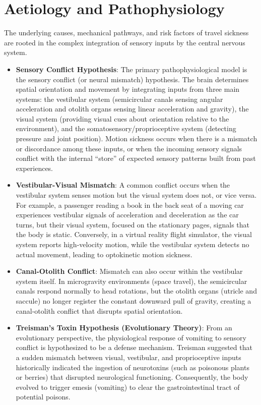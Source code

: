 \section*{Aetiology and Pathophysiology}
The underlying causes, mechanical pathways, and risk factors of travel sickness are rooted in the complex integration of sensory inputs by the central nervous system.
\begin{itemize}
    \item \textbf{Sensory Conflict Hypothesis}: The primary pathophysiological model is the sensory conflict (or neural mismatch) hypothesis. The brain determines spatial orientation and movement by integrating inputs from three main systems: the vestibular system (semicircular canals sensing angular acceleration and otolith organs sensing linear acceleration and gravity), the visual system (providing visual cues about orientation relative to the environment), and the somatosensory/proprioceptive system (detecting pressure and joint position). Motion sickness occurs when there is a mismatch or discordance among these inputs, or when the incoming sensory signals conflict with the internal ``store'' of expected sensory patterns built from past experiences.
    \item \textbf{Vestibular-Visual Mismatch}: A common conflict occurs when the vestibular system senses motion but the visual system does not, or vice versa. For example, a passenger reading a book in the back seat of a moving car experiences vestibular signals of acceleration and deceleration as the car turns, but their visual system, focused on the stationary pages, signals that the body is static. Conversely, in a virtual reality flight simulator, the visual system reports high-velocity motion, while the vestibular system detects no actual movement, leading to optokinetic motion sickness.
    \item \textbf{Canal-Otolith Conflict}: Mismatch can also occur within the vestibular system itself. In microgravity environments (space travel), the semicircular canals respond normally to head rotations, but the otolith organs (utricle and saccule) no longer register the constant downward pull of gravity, creating a canal-otolith conflict that disrupts spatial orientation.
    \item \textbf{Treisman's Toxin Hypothesis (Evolutionary Theory)}: From an evolutionary perspective, the physiological response of vomiting to sensory conflict is hypothesized to be a defense mechanism. Treisman suggested that a sudden mismatch between visual, vestibular, and proprioceptive inputs historically indicated the ingestion of neurotoxins (such as poisonous plants or berries) that disrupted neurological functioning. Consequently, the body evolved to trigger emesis (vomiting) to clear the gastrointestinal tract of potential poisons.

\end{itemize}
